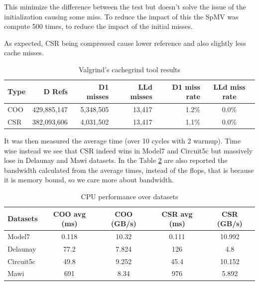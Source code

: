 \documentclass[conference]{IEEEtran}
\begin{document}
This minimize the difference between the test but doesn't solve the issue of the initialization causing some miss. To reduce the impact of this the SpMV was compute 500 times, to reduce the impact of the initial misses.

As expected, CSR being compressed cause lower reference and also slightly less cache misses.
\begin{table}[hbt!]
	\centering
	\begin{adjustbox}{width=\columnwidth}
		\begin{tabular}{lrrrrc}
			\toprule
			\textbf{Type} & \textbf{D Refs} & \textbf{D1 misses} & \textbf{LLd misses} & \textbf{D1 miss rate} & \textbf{LLd miss rate} \\
			\midrule
			COO & 429,885,147 & 5,348,505 & 13,417 & 1.2\% & 0.0\% \\
			CSR & 382,093,606 & 4,031,502 & 13,417 & 1.1\% & 0.0\% \\
			\bottomrule
		\end{tabular}
	\end{adjustbox}
	\vspace{1em}

	\caption{Valgrind's cachegrind tool results}
	\label{tab:cache-results}
\end{table}

It was then measured the average time (over 10 cycles with 2 warmup). Time wise instead we see that CSR indeed wins in Model7 and Circuit5c but massively lose in Delaunay and Mawi datasets. In the Table \ref{tab:time-cpu-results} are also reported the bandwidth calculated from the average times, instead of the flops, that is because it is memory bound, so we care more about bandwidth.

\begin{table}[hbt!]
	\centering
	\begin{adjustbox}{width=\columnwidth}
		\begin{tabular}{lcccc}
			\toprule
			\textbf{Datasets} & \textbf{COO avg (ms)} &\textbf{COO (GB/s)} & \textbf{CSR avg (ms)} & \textbf{CSR (GB/s)}\\
			\midrule
			Model7 & 0.118 & 10.32 & 0.111 & 10.992\\
			Delaunay & 77.2 & 7.824 & 126 & 4.8\\
			Circuit5c & 49.8 & 9.252 & 45.4 & 10.152\\
			Mawi & 691 & 8.34 & 976 & 5.892\\
			\bottomrule
		\end{tabular}
	\end{adjustbox}
	\vspace{1em}

	\caption{CPU performance over datasets}
	\label{tab:time-cpu-results}
\end{table}
\end{document}
